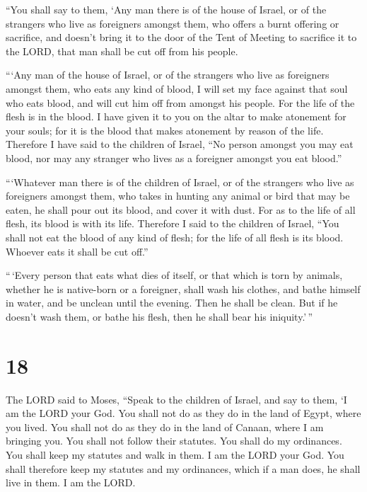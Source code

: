  ``You shall say to them, `Any man there is of the house of
Israel, or of the strangers who live as foreigners amongst them, who
offers a burnt offering or sacrifice,  and doesn't bring it
to the door of the Tent of Meeting to sacrifice it to the LORD, that man
shall be cut off from his people.

 ```Any man of the house of Israel, or of the strangers who
live as foreigners amongst them, who eats any kind of blood, I will set
my face against that soul who eats blood, and will cut him off from
amongst his people.  For the life of the flesh is in the
blood. I have given it to you on the altar to make atonement for your
souls; for it is the blood that makes atonement by reason of the life.
 Therefore I have said to the children of Israel, ``No
person amongst you may eat blood, nor may any stranger who lives as a
foreigner amongst you eat blood.''

 ```Whatever man there is of the children of Israel, or of
the strangers who live as foreigners amongst them, who takes in hunting
any animal or bird that may be eaten, he shall pour out its blood, and
cover it with dust.  For as to the life of all flesh, its
blood is with its life. Therefore I said to the children of Israel,
``You shall not eat the blood of any kind of flesh; for the life of all
flesh is its blood. Whoever eats it shall be cut off.''

 ``\,`Every person that eats what dies of itself, or that
which is torn by animals, whether he is native-born or a foreigner,
shall wash his clothes, and bathe himself in water, and be unclean until
the evening. Then he shall be clean.  But if he doesn't
wash them, or bathe his flesh, then he shall bear his iniquity.'\,''

\hypertarget{section-17}{%
\section{18}\label{section-17}}

 The LORD said to Moses,  ``Speak to the
children of Israel, and say to them, `I am the LORD your God.
 You shall not do as they do in the land of Egypt, where you
lived. You shall not do as they do in the land of Canaan, where I am
bringing you. You shall not follow their statutes.  You
shall do my ordinances. You shall keep my statutes and walk in them. I
am the LORD your God.  You shall therefore keep my statutes
and my ordinances, which if a man does, he shall live in them. I am the
LORD.

